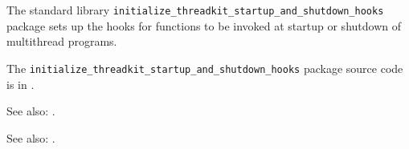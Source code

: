 
The standard library {\tt initialize\_threadkit\_startup\_and\_shutdown\_hooks} package sets up the hooks for 
functions to be invoked at startup or shutdown of multithread programs.

The {\tt initialize\_threadkit\_startup\_and\_shutdown\_hooks} package source code is in .

See also: .

See also: .

